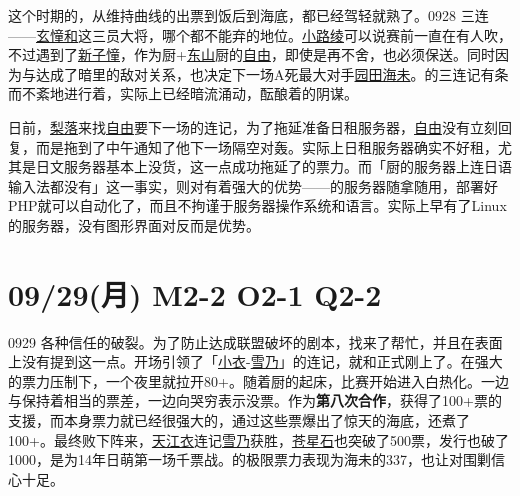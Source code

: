 这个时期的，从维持曲线的出票到饭后到海底，都已经驾轻就熟了。0928 三连——\uline{玄憧和}这三员大将，哪个都不能弃的地位。\uline{小路绫}可以说赛前一直在有人吹，不过遇到了\uline{新子憧}，作为厨+\uline{东山}厨的\uline{自由}，即使是再不舍，也必须保送。同时因为与达成了暗里的敌对关系，也决定下一场A死最大对手\uline{园田海未}。的三连记有条而不紊地进行着，实际上已经暗流涌动，酝酿着的阴谋。

日前，\uline{梨落}来找\uline{自由}要下一场的连记，为了拖延准备日租服务器，\uline{自由}没有立刻回复，而是拖到了中午通知了他下一场隔空对轰。实际上日租服务器确实不好租，尤其是日文服务器基本上没货，这一点成功拖延了的票力。而「厨的服务器上连日语输入法都没有」这一事实，则对有着强大的优势——的服务器随拿随用，部署好PHP就可以自动化了，而且不拘谨于服务器操作系统和语言。实际上早有了Linux的服务器，没有图形界面对反而是优势。

\section{09/29(月) M2-2 O2-1 Q2-2}


0929 各种信任的破裂。为了防止达成联盟破坏的剧本，找来了帮忙，并且在表面上没有提到这一点。开场引领了「\uline{小衣}-\uline{雪乃}」的连记，就和正式刚上了。在强大的票力压制下，一个夜里就拉开80+。随着厨的起床，比赛开始进入白热化。一边与保持着相当的票差，一边向哭穷表示没票。作为\textbf{第八次合作}，获得了100+票的支援，而本身票力就已经很强大的，通过这些票爆出了惊天的海底，还煮了100+。最终败下阵来，\uline{天江衣}连记\uline{雪乃}获胜，\uline{苍星石}也突破了500票，发行也破了1000，是为14年日萌第一场千票战。的极限票力表现为海未的337，也让对围剿信心十足。

